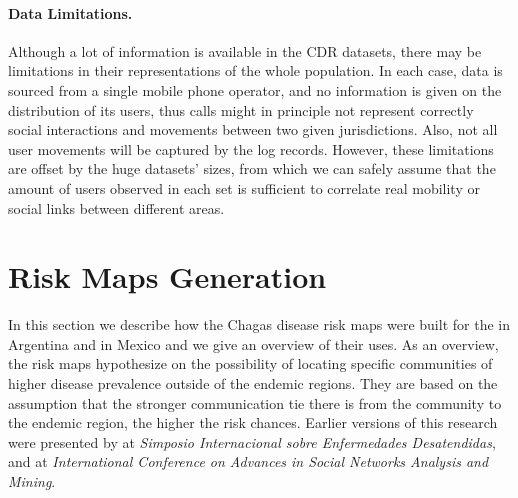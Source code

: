

\paragraph{Data Limitations.}
Although a lot of information is available in the CDR datasets, there may be limitations in their representations of the whole population.
In each case, data is sourced from a single mobile phone operator, and no information is given on the distribution of its users, thus calls might in principle not represent correctly social interactions and movements between two given jurisdictions.
Also, not all user movements will be captured by the log records.
However, these limitations are offset by the huge datasets' sizes, from which we can safely assume that the amount of users observed in each set is sufficient to correlate real mobility or social links between different areas.




\section{ Risk Maps Generation}\label{section:risk_maps}

In this section we describe how the Chagas disease risk maps were built for the in Argentina and in Mexico and we give an overview of their uses.
As an overview, the risk maps hypothesize on the possibility of locating specific communities of higher disease prevalence outside of the endemic regions.
They are based on the assumption that the stronger communication tie there is from the community to the endemic region, the higher the risk chances.
Earlier versions of this research were presented by \cite{sarraute2015descubriendo}
at \emph{Simposio Internacional sobre Enfermedades Desatendidas},
and\cite{deMonasterio2016analyzing} at \emph{International Conference on Advances in Social Networks Analysis and Mining}.

